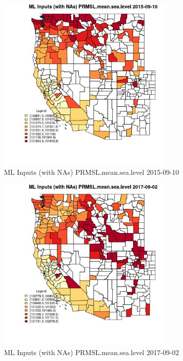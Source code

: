 \begin{figure} 
\centering  
\includegraphics[width=0.77\textwidth]{Code_Outputs/Report_ML_input_PM25_Step4_part_e_de_duplicated_aves_compiled_2019-05-21wNAs_CountyPRMSLmeansealevelMean2015-09-10.jpg} 
\caption{\label{fig:Report_ML_input_PM25_Step4_part_e_de_duplicated_aves_compiled_2019-05-21wNAsCountyPRMSLmeansealevelMean2015-09-10}ML Inputs (with NAs) PRMSL.mean.sea.level 2015-09-10} 
\end{figure} 
 

\begin{figure} 
\centering  
\includegraphics[width=0.77\textwidth]{Code_Outputs/Report_ML_input_PM25_Step4_part_e_de_duplicated_aves_compiled_2019-05-21wNAs_CountyPRMSLmeansealevelMean2017-09-02.jpg} 
\caption{\label{fig:Report_ML_input_PM25_Step4_part_e_de_duplicated_aves_compiled_2019-05-21wNAsCountyPRMSLmeansealevelMean2017-09-02}ML Inputs (with NAs) PRMSL.mean.sea.level 2017-09-02} 
\end{figure} 
 

